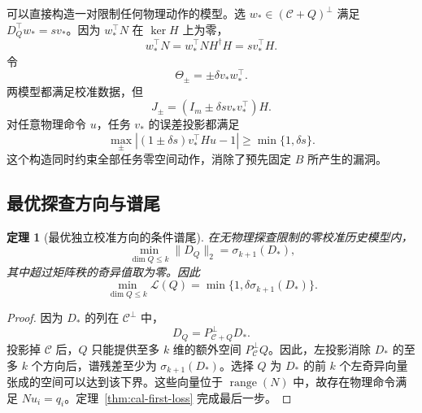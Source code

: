 \documentclass[11pt,a4paper]{article}
\numberwithin{equation}{section}
\newtheorem{theorem}{定理}[section]
\theoremstyle{definition}
\begin{document}
可以直接构造一对限制任何物理动作的模型。选 $w_*\in(\mathcal C+Q)^\perp$ 满足 $D_Q^\top w_*=sv_*$。因为 $w_*^\top N$ 在 $\ker H$ 上为零，
\begin{equation}
  w_*^\top N
  =w_*^\top NH^\dagger H
  =sv_*^\top H .
  \label{eq:cal-adversary-factor}
\end{equation}
令
\begin{equation}
  \Theta_\pm=\pm\delta v_*w_*^\top .
\end{equation}
两模型都满足校准数据，但
\begin{equation}
  J_\pm=
  (I_m\pm\delta s v_*v_*^\top)H .
  \label{eq:cal-adversary-J}
\end{equation}
对任意物理命令 $u$，任务 $v_*$ 的误差投影都满足
\begin{equation}
  \max_{\pm}
  \left|
  (1\pm\delta s)v_*^\top Hu-1
  \right|
  \ge\min\{1,\delta s\}.
  \label{eq:cal-anyphysical-lower}
\end{equation}
这个构造同时约束全部任务零空间动作，消除了预先固定 $B$ 所产生的漏洞。

\subsection{最优探查方向与谱尾}

\begin{theorem}[最优独立校准方向的条件谱尾]
\label{thm:cal-width}
在无物理探查限制的零校准历史模型内，
\begin{equation}
  \min_{\dim Q\le k}\|D_Q\|_2
  =\sigma_{k+1}(D_*),
  \label{eq:cal-quotient-width}
\end{equation}
其中超过矩阵秩的奇异值取为零。因此
\begin{equation}
  \boxed{
  \min_{\dim Q\le k}\mathcal L(Q)
  =\min\{1,\delta\sigma_{k+1}(D_*)\}.}
  \label{eq:cal-minimax-width}
\end{equation}
\end{theorem}

\begin{proof}
因为 $D_*$ 的列在 $\mathcal C^\perp$ 中，
\begin{equation}
  D_Q=P_{\mathcal C+Q}^\perp D_* .
\end{equation}
投影掉 $\mathcal C$ 后，$Q$ 只能提供至多 $k$ 维的额外空间 $P_{\mathcal C}^\perp Q$。因此，左投影消除 $D_*$ 的至多 $k$ 个方向后，谱残差至少为 $\sigma_{k+1}(D_*)$。选择 $Q$ 为 $D_*$ 的前 $k$ 个左奇异向量张成的空间可以达到该下界。这些向量位于 $\operatorname{range}(N)$ 中，故存在物理命令满足 $Nu_i=q_i$。定理~\ref{thm:cal-first-loss} 完成最后一步。
\end{proof}
\end{document}
